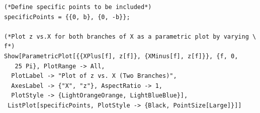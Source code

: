 \documentclass[12pt,oneside]{report}
\theoremstyle{definition}
\begin{document}
\begin{verbatim}
(*Define specific points to be included*)
specificPoints = {{0, b}, {0, -b}};

(*Plot z vs.X for both branches of X as a parametric plot by varying \
f*)
Show[ParametricPlot[{{XPlus[f], z[f]}, {XMinus[f], z[f]}}, {f, 0, 
   25 Pi}, PlotRange -> All, 
  PlotLabel -> "Plot of z vs. X (Two Branches)", 
  AxesLabel -> {"X", "z"}, AspectRatio -> 1, 
  PlotStyle -> {LightOrangeOrange, LightBlueBlue}], 
 ListPlot[specificPoints, PlotStyle -> {Black, PointSize[Large]}]]
\end{verbatim}


\printbibliography %
\end{document}
